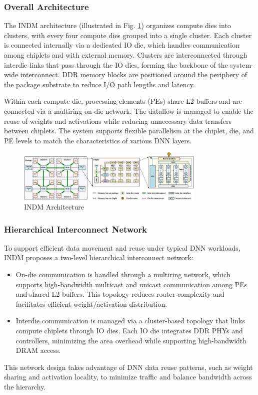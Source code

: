 \documentclass[acmsmall]{acmart}
\begin{document}
\subsubsection{Overall Architecture} 
The INDM architecture (illustrated in Fig. \ref{fig:indmArchitecture}) organizes compute dies into clusters, with every four compute dies grouped into a single cluster. Each cluster is connected internally via a dedicated IO die, which handles communication among chiplets and with external memory. Clusters are interconnected through interdie links that pass through the IO dies, forming the backbone of the system-wide interconnect. DDR memory blocks are positioned around the periphery of the package substrate to reduce I/O path lengths and latency.

Within each compute die, processing elements (PEs) share L2 buffers and are connected via a multiring on-die network. The dataflow is managed to enable the reuse of weights and activations while reducing unnecessary data transfers between chiplets. The system supports flexible parallelism at the chiplet, die, and PE levels to match the characteristics of various DNN layers.

\begin{figure}[h]
  \centering
  \includegraphics[width=0.8\textwidth]{figures/indmArchitecture.png}
  \caption{INDM Architecture \cite{INDM}}
  \label{fig:indmArchitecture}
\end{figure}

\subsubsection{Hierarchical Interconnect Network}
To support efficient data movement and reuse under typical DNN workloads, INDM proposes a two-level hierarchical interconnect network:
\begin{itemize}
  \item On-die communication is handled through a multiring network, which supports high-bandwidth multicast and unicast communication among PEs and shared L2 buffers. This topology reduces router complexity and facilitates efficient weight/activation distribution.
  \item Interdie communication is managed via a cluster-based topology that links compute chiplets through IO dies. Each IO die integrates DDR PHYs and controllers, minimizing the area overhead while supporting high-bandwidth DRAM access.
\end{itemize}
This network design takes advantage of DNN data reuse patterns, such as weight sharing and activation locality, to minimize traffic and balance bandwidth across the hierarchy. 
\end{document}
